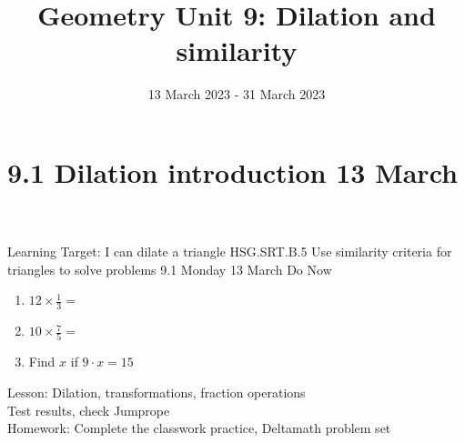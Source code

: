 

\newcommand\ticks{}
  \def\ticks{{Bar[scale=2]}-{Bar[scale=2]}}
\newcommand\paraticks{}
  \def\paraticks{{Straight Barb[reversed, scale=2]}-{Straight Barb[scale=2]}}

\title{Geometry Unit 9: Dilation and similarity}
\date{13 March 2023 - 31 March 2023}


\frame{\titlepage}
\section[Outline]{}
\frame{\tableofcontents}

\section{9.1 Dilation introduction \hfill 13 March \,}
\begin{frame}{Learning Target: I can dilate a triangle}
  {HSG.SRT.B.5 Use similarity criteria for triangles to solve problems \hfill \alert{9.1 Monday 13 March}}
    Do Now
    \begin{enumerate}
      \item $12 \times \frac{1}{3}=$
      \item $10 \times \frac{7}{5}=$
      \item Find $x$ if $9 \cdot x = 15$
    \end{enumerate}
    Lesson: Dilation, transformations, fraction operations \\
    Test results, check Jumprope\\[0.5cm]
    Homework: Complete the classwork practice, Deltamath problem set
\end{frame}

